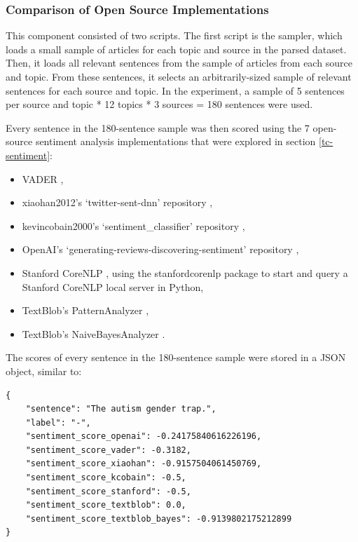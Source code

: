 \documentclass{report}
\begin{document}
\subsubsection{Comparison of Open Source Implementations} \label{des-sentiment-comparison}

This component consisted of two scripts.
The first script is the sampler, which loads a small sample of articles for each topic and source in the parsed dataset.
Then, it loads all relevant sentences from the sample of articles from each source and topic.
From these sentences, it selects an arbitrarily-sized sample of relevant sentences for each source and topic.
In the experiment, a sample of 5 sentences per source and topic * 12 topics * 3 sources = 180 sentences were used.

Every sentence in the 180-sentence sample was then scored using the 7 open-source sentiment analysis implementations that were explored in section \ref{tc-sentiment}:
\begin{itemize}
	\item VADER \cite{VADER},
	\item xiaohan2012's `twitter-sent-dnn' repository \cite{kalchbrennerACL2014},
	\item kevincobain2000's `sentiment\_classifier' repository \cite{kevincobain},
	\item OpenAI's `generating-reviews-discovering-sentiment' repository \cite{OpenAI},
	\item Stanford CoreNLP \cite{StanfordNLP}, using the stanfordcorenlp package \cite{stanfordcorenlp} to start and query a Stanford CoreNLP local server in Python,
	\item TextBlob's PatternAnalyzer \cite{textblob},
	\item TextBlob's NaiveBayesAnalyzer \cite{textblob}.
\end{itemize}

The scores of every sentence in the 180-sentence sample were stored in a JSON object, similar to:
\begin{lstlisting}
{
	"sentence": "The autism gender trap.",
	"label": "-",
	"sentiment_score_openai": -0.24175840616226196,
	"sentiment_score_vader": -0.3182,
	"sentiment_score_xiaohan": -0.9157504061450769,
	"sentiment_score_kcobain": -0.5,
	"sentiment_score_stanford": -0.5,
	"sentiment_score_textblob": 0.0,
	"sentiment_score_textblob_bayes": -0.9139802175212899
}
\end{lstlisting}
\end{document}
